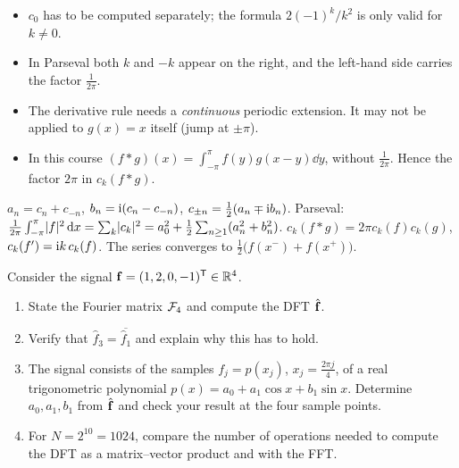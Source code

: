 \begin{solution}
\begin{trap}
\begin{itemize}
\item $c_0$ has to be computed separately; the formula $2(-1)^k/k^2$ is only valid for $k\neq0$.
\item In Parseval both $k$ and $-k$ appear on the right, and the left-hand side carries the factor $\frac1{2\pi}$.
\item The derivative rule needs a \emph{continuous} periodic extension. It may not be applied to $g(x)=x$ itself (jump at $\pm\pi$).
\item In this course $(f\ast g)(x)=\int_{-\pi}^\pi f(y)g(x-y)\dd y$, without $\frac1{2\pi}$. Hence the factor $2\pi$ in $c_k(f\ast g)$.
\end{itemize}
\end{trap}
\begin{heart}
$a_n=c_n+c_{-n}$, $b_n=\mathrm{i}(c_n-c_{-n})$, $c_{\pm n}=\frac12(a_n\mp\mathrm{i} b_n)$. Parseval: $\frac1{2\pi}\int_{-\pi}^{\pi}\lvert f\rvert^2\,\mathrm{d} x=\sum_k\lvert c_k\rvert^2=a_0^2+\frac12\sum_{n\ge1}(a_n^2+b_n^2)$.
$c_k(f\ast g)=2\pi c_k(f)c_k(g)$, $c_k(f')=\mathrm{i} k\,c_k(f)$. The series converges to $\frac12\big(f(x^-)+f(x^+)\big)$.
\end{heart}
\end{solution}

Consider the signal $\mathbf{f}=(1,2,0,-1)^{\mathsf{T}}\in\mathbb{R}^4$.
\begin{enumerate}
\item State the Fourier matrix $\mathcal{F}_4$ and compute the DFT $\hat{\mathbf{f}}$.
\item Verify that $\hat f_3=\overline{\hat f_1}$ and explain why this has to hold.
\item The signal consists of the samples $f_j=p(x_j)$, $x_j=\frac{2\pi j}{4}$, of a real trigonometric polynomial $p(x)=a_0+a_1\cos x+b_1\sin x$. Determine $a_0,a_1,b_1$ from $\hat{\mathbf{f}}$ and check your result at the four sample points.
\item For $N=2^{10}=1024$, compare the number of operations needed to compute the DFT as a matrix--vector product and with the FFT.
\end{enumerate}

